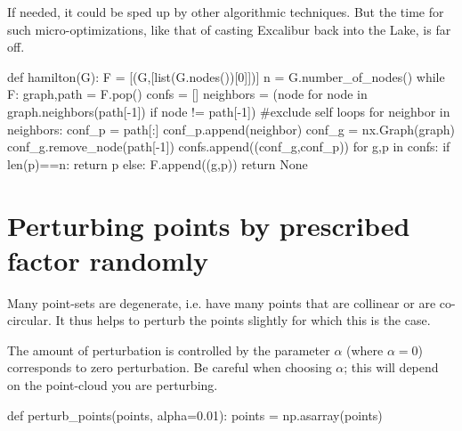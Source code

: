 If needed, it could be sped up by other algorithmic techniques. 
But the time for such micro-optimizations, like that of casting 
Excalibur back into the Lake, is far off. 


\nwenddocs{}\plusendmoddef\nwstartdeflinemarkup{}\nwenddeflinemarkup
def hamilton(G):
    F = [(G,[list(G.nodes())[0]])]
    n = G.number_of_nodes()
    while F:
        graph,path = F.pop()
        confs = []
        neighbors = (node for node in graph.neighbors(path[-1]) 
                     if node != path[-1]) #exclude self loops
        for neighbor in neighbors:
            conf_p = path[:]
            conf_p.append(neighbor)
            conf_g = nx.Graph(graph)
            conf_g.remove_node(path[-1])
            confs.append((conf_g,conf_p))
        for g,p in confs:
            if len(p)==n:
                return p
            else:
                F.append((g,p))
    return None
\nwendcode{}\nwdocspar

\section{Perturbing points by prescribed factor randomly}

Many point-sets are degenerate, i.e. have many points that are collinear
or are co-circular. It thus helps to perturb the points slightly for which
this is the case. 

The amount of perturbation is controlled by the parameter $\alpha$ (where $\alpha=0$)
corresponds to zero perturbation. {\color{red} Be careful when choosing $\alpha$; this 
will depend on the point-cloud you are perturbing.}

\nwenddocs{}\plusendmoddef\nwstartdeflinemarkup{}\nwenddeflinemarkup
def perturb_points(points, alpha=0.01):
     points = np.asarray(points)

